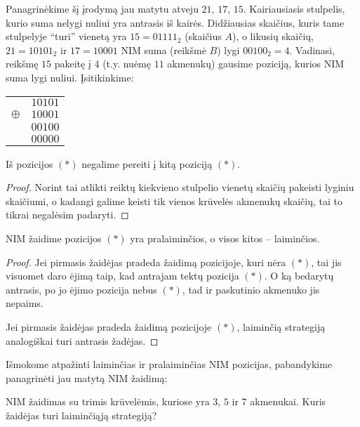 Panagrinėkime šį įrodymą jau matytu atveju $21$, $17$, $15$. Kairiausiasis
stulpelis, kurio suma nelygi nuliui yra antrasis iš kairės. Didžiausias
skaičius, kuris tame stulpelyje ``turi'' vienetą yra $15 = 01111_2$
(skaičius $A$), o likusių skaičių, $21=10101_2$ ir $17=10001$ NIM suma
(reikšmė $B$) lygi $00100_2=4$. Vadinasi, reikšmę $15$ pakeitę į $4$ (t.y.
nuėmę $11$ akmenukų) gausime poziciją, kurios NIM suma lygi nuliui.
Įsitikinkime: 

\begin{center}
  \begin{tabular}[c]{r c}
    & $10101$ \\
    $\oplus$ & $10001$ \\
    & $00100$ \\ \hline
    & $00000$
  \end{tabular}
\end{center}

\begin{teig}
  Iš pozicijos $(*)$ negalime pereiti į kitą poziciją $(*)$.
\end{teig}

\begin{proof}
  Norint tai atlikti reiktų kiekvieno stulpelio vienetų skaičių pakeisti
  lyginiu skaičiumi, o kadangi galime keisti tik vienos krūvelės akmenukų
  skaičių, tai to tikrai negalėsim padaryti.
\end{proof}

\begin{thm}
  NIM žaidime pozicijos $(*)$ yra pralaiminčios, o visos kitos --
  laiminčios.
\end{thm}

\begin{proof}
    Jei pirmasis žaidėjas pradeda žaidimą pozicijoje, kuri nėra $(*)$, tai
    jis visuomet daro ėjimą taip, kad antrajam tektų pozicija $(*)$. O ką
    bedarytų antrasis, po jo ėjimo pozicija nebus $(*)$, tad ir paskutinio
    akmenuko jis nepaims.

    Jei pirmasis žaidėjas pradeda žaidimą pozicijoje $(*)$, laiminčią
    strategiją analogiškai turi antrasis žadėjas.
\end{proof}

Išmokome atpažinti laiminčias ir pralaiminčias NIM pozicijas, pabandykime
panagrinėti jau matytą NIM žaidimą:

\begin{pavnr}
  NIM žaidimas su trimis krūvelėmis, kuriose yra $3$, $5$ ir $7$ akmenukai. Kuris
  žaidėjas turi laiminčiąją strategiją?
\end{pavnr}

